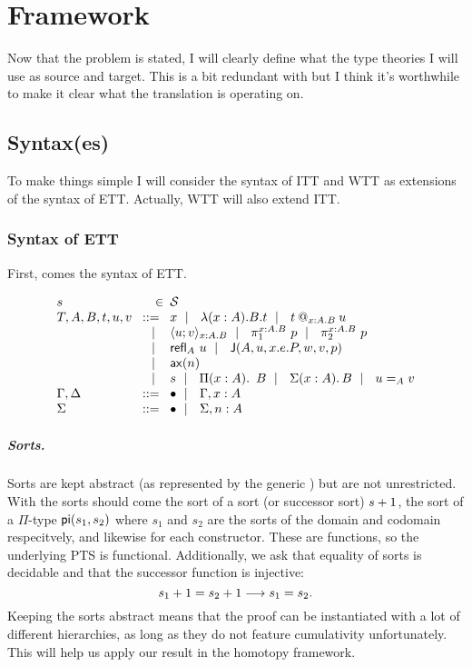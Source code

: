 \chapter{Framework}

Now that the problem is stated, I will clearly define what the type theories
I will use as source and target. This is a bit redundant with 
but I think it's worthwhile to make it clear what the translation is operating
on.

\section{Syntax(es)}

To make things simple I will consider the syntax of \acrshort{ITT} and
\acrshort{WTT} as extensions of the syntax of \acrshort{ETT}.
Actually, \acrshort{WTT} will also extend \acrshort{ITT}.

\subsection{Syntax of \acrshort{ETT}}

First, comes the syntax of \acrshort{ETT}.

\[
  \begin{array}{l@{~\,}r@{~\,}l}
    s &\in& \cS \\
    T,A,B,t,u,v &\bnf& x \bnfor \lam{x:A}{B} t \bnfor \app{t}{x:A}{B}{u} \\
    &\bnfor& \pair{x:A}{B}{u}{v} \bnfor \pio{x:A}{B}{p} \bnfor \pit{x:A}{B}{p} \\
    &\bnfor& \refl{A} u \bnfor \J{A}{u}{x.e.P}{w}{v}{p} \\
    &\bnfor& \ax{n} \\
    &\bnfor& s \bnfor \Prod{x:A} B \bnfor \Sum{x:A} B \bnfor \Eq{A}{u}{v} \\
    \Ga, \D &\bnf& \ctxempty \bnfor \Ga, x:A \\
    \Sigma &\bnf& \ctxempty \bnfor \Sigma, n:A
  \end{array}
\]

\paragraph{Sorts.}

Sorts are kept abstract (as represented by the generic \cS) but are not
unrestricted. With the sorts should come the sort of a sort (or successor
sort) \(s+1\), the sort of a \(\Pi\)-type \(\mathsf{pi}(s_1,s_2)\)
where \(s_1\) and \(s_2\) are the sorts of the domain and codomain respecitvely,
and likewise for each constructor.
These are functions, so the underlying \acrshort{PTS} is functional.
Additionally, we ask that equality of sorts is decidable and that the successor
function is injective:
\[
  s_1+1 = s_2+1 \longrightarrow s_1 = s_2.
\]
Keeping the sorts abstract means that the proof can be instantiated with a lot
of different hierarchies, as long as they do not feature cumulativity
unfortunately. This will help us apply our result in the homotopy framework.

